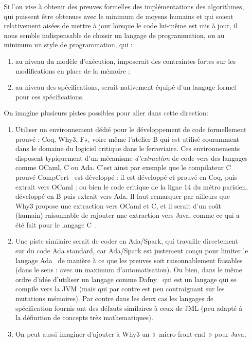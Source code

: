 \documentclass[a4paper]{report}
\begin{document}
Si l'on vise à obtenir des
preuves formelles des implémentations des algorithmes, qui puissent être
obtenues avec le minimum de moyens humains et qui soient relativement aisées de
mettre à jour lorsque le code lui-même est mis à jour, il nous semble
indispensable de choisir un langage de programmation, ou au minimum un style de
programmation, qui :
\begin{enumerate}
\item au niveau du modèle d'exécution, imposerait des contraintes fortes sur les
  modifications en place de la mémoire ;
\item au niveau des spécifications, serait nativement équipé d'un langage formel
  pour ces spécifications.
\end{enumerate}
On imagine plusieurs pistes possibles pour aller dans cette direction:
\begin{enumerate}
\item Utiliser un environnement dédié pour le développement de code formellement
  prouvé : Coq, Why3, F$\star$, voire même l'atelier B qui
  est utilisé couramment dans le domaine du logiciel critique dans le
  ferroviaire. Ces environnements disposent typiquement d'un mécanisme
  \emph{d'extraction} de code vers des langages comme OCaml, C ou Ada. C'est
  ainsi par exemple que le compilateur C prouvé CompCert~\cite{boldo14jar} est
  développé : il est développé et prouvé en Coq, puis extrait vers OCaml ; ou
  bien le code critique de la ligne 14 du métro parisien, développé en B puis
  extrait vers Ada.  Il faut remarquer par ailleurs que Why3 propose une
  extraction vers OCaml et C, et il serait d'un coût (humain) raisonnable de
  rajouter une extraction vers Java, comme ce qui a été fait pour le langage
  C~\cite{rieuhelft17vstte}.
\item Une piste similaire serait de coder en Ada/Spark, qui travaille
  directement sur du code Ada standard, car Ada/Spark est justement conçu pour
  limiter le langage Ada~\cite{adacore18guide,kosmatov16isola} de manière à ce
  que les preuves soit raisonnablement faisables (dans le sens : avec un maximum
  d'automatisation).  Ou bien, dans le même ordre d'idée d'utiliser un langage
  comme Dafny~\cite{leino14fide} qui est un langage qui se compile vers la JVM
  (mais qui par contre est peu contraignant sur les mutations mémoires). Par
  contre dans les deux cas les langages de spécification fournis ont des défauts
  similaires à ceux de JML (peu adapté à la définition de concepts très
  mathematiques).
\item On peut aussi imaginer d'ajouter à Why3 un «~micro-front-end~» pour Java,

\end{enumerate}
\end{document}
